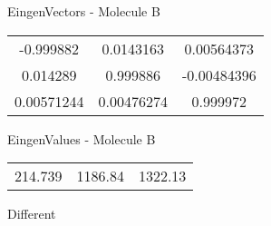 \begin{multicols}{2}
\begin{center}
\vtab
 EingenVectors - Molecule B     \\
\vtab
\begin{tabular}{|c c c|}
-0.999882	 & 	0.0143163	 & 	0.00564373	 \\
0.014289	 & 	0.999886	 & 	-0.00484396	 \\
0.00571244	 & 	0.00476274	 & 	0.999972
\end{tabular}

\vtab
 EingenValues - Molecule B     \\
\vtab
\begin{tabular}{|c c c|}
214.739	 & 	1186.84	 & 	1322.13	 \\
\end{tabular}

\end{center}
\end{multicols}
\begin{center}
\vtab
\vtab
\textcolor{NavyBlue}{\Large Different}
\end{center}

 \newpage

